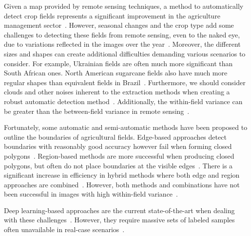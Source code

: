 \documentclass[12pt]{article}
\begin{document}
Given a map provided by remote sensing techniques, a method to automatically detect crop fields represents a significant improvement in the agriculture management sector~\citep{garcia2017,garcia2018,garcia2019}. However, seasonal changes and the crop type add some challenges to detecting these fields from remote sensing, even to the naked eye, due to variations reflected in the images over the year~\citep{north2019}. Moreover, the different sizes and shapes can create additional difficulties demanding various scenarios to consider. For example, Ukrainian fields are often much more significant than South African ones. North American sugarcane fields also have much more regular shapes than equivalent fields in Brazil~\cite{waldner2020}. Furthermore, we should consider clouds and other noises inherent to the extraction methods when creating a robust automatic detection method~\citep{graesser2017,north2019}. Additionally, the within-field variance can be greater than the between-field variance in remote sensing~\cite{evans2002}.

Fortunately, some automatic and semi-automatic methods have been proposed to outline the boundaries of agricultural fields. Edge-based approaches detect boundaries with reasonably good accuracy however fail when forming closed polygons~\cite{taravat2021,waldner2021}. Region-based methods are more successful when producing closed polygons, but often do not place boundaries at the visible edges~\cite{taravat2021}. There is a significant increase in efficiency in hybrid methods where both edge and region approaches are combined~\cite{garcia2017}. However, both methods and combinations have not been successful in images with high within-field variance~\cite{mueller2004,zhang2021}.

Deep learning-based approaches are the current state-of-the-art when dealing with these challenges~\citep{waldner2021,zhang2021}. However, they require massive sets of labeled samples often unavailable in real-case scenarios~\cite{kokkinos2016, ma2019,kamilaris2018}. 


\end{document}
